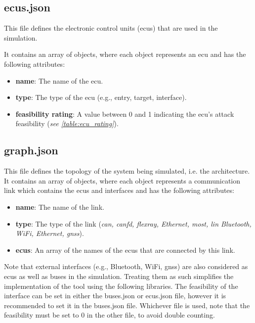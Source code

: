 \subsection{ecus.json}
\label{sec:ecus}

This file defines the electronic control units (\acrshort{ecu}s) that are used in the simulation. 

It contains an array of objects, where each object represents an \acrshort{ecu} and has the following attributes:

\begin{itemize}
\item \textbf{name}: The name of the \acrshort{ecu}.
\item \textbf{type}: The type of the \acrshort{ecu} (e.g., entry, target, interface).
\item \textbf{feasibility rating}: A value between 0 and 1 indicating the \acrshort{ecu}'s attack feasibility (\textit{see \ref{table:ecu_rating}}).
\end{itemize}

\subsection{graph.json}
\label{sec:graph}

This file defines the topology of the system being simulated, i.e. the architecture. 
It contains an array of objects, where each object represents a communication link which contains the \acrshort{ecu}s and interfaces and has the following attributes:

\begin{itemize}
\item \textbf{name}: The name of the link.
\item \textbf{type}: The type of the link (\textit{\acrshort{can}, \acrshort{canfd}, \acrshort{flexray}, Ethernet, \acrshort{most}, \acrshort{lin} Bluetooth, WiFi, Ethernet, \acrshort{gnss}}).
\item \textbf{\acrshort{ecu}s}: An array of the names of the \acrshort{ecu}s that are connected by this link.
\end{itemize}

Note that external interfaces (e.g., Bluetooth, WiFi, \acrshort{gnss}) are also considered as \acrshort{ecu}s as well as buses in the simulation.
Treating them as such simplifies the implementation of the tool using the following libraries.
The feasibility of the interface can be set in either the buses.json or ecus.json file, however it is recommended to set it in the buses.json file.
Whichever file is used, note that the feasibility must be set to 0 in the other file, to avoid double counting.


